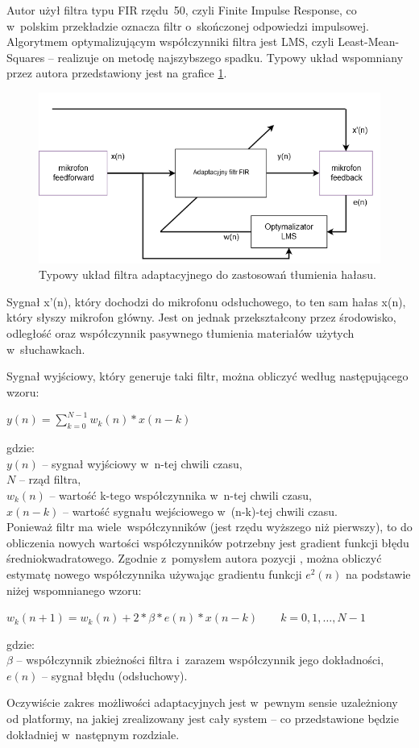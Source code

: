 Autor użył filtra typu FIR rzędu~50, czyli Finite Impulse Response, co w~polskim przekładzie oznacza filtr o~skończonej odpowiedzi impulsowej. Algorytmem optymalizującym współczynniki filtra jest LMS, czyli Least-Mean-Squares -- realizuje on metodę najszybszego spadku. Typowy układ wspomniany przez autora przedstawiony jest na grafice \ref{fig:typical_fir_lms}.
\begin{figure}[h!]
	\centering
	\includegraphics[width=\linewidth]{../Assets/typical_fir_lms.png}
	\caption{Typowy układ filtra adaptacyjnego do zastosowań tłumienia hałasu.}
	\label{fig:typical_fir_lms}
\end{figure}

Sygnał x'(n), który dochodzi do mikrofonu odsłuchowego, to ten sam hałas x(n), który słyszy mikrofon główny. Jest on jednak przekształcony przez środowisko, odległość oraz współczynnik pasywnego tłumienia materiałów użytych w~słuchawkach.

Sygnał wyjściowy, który generuje taki filtr, można obliczyć według następującego wzoru:\\
\begin{center} $ y(n) = \sum_{k=0}^{N-1} w_k(n)*x(n-k) $ \end{center}
gdzie:\\
$y(n)$ -- sygnał wyjściowy w~n-tej chwili czasu,\\
$N$ -- rząd filtra,\\
$w_k(n)$ -- wartość k-tego współczynnika w~n-tej chwili czasu,\\
$x(n-k)$ -- wartość sygnału wejściowego w~(n-k)-tej chwili czasu.\\
Ponieważ filtr ma wiele~współczynników (jest rzędu wyższego niż pierwszy), to do obliczenia nowych wartości współczynników potrzebny jest gradient funkcji błędu średniokwadratowego. Zgodnie z~pomysłem autora pozycji \cite{Chassaing}, można obliczyć estymatę nowego współczynnika używając gradientu funkcji $e^2(n)$ na podstawie niżej wspomnianego wzoru:\\
\begin{center} $ w_k(n+1) = w_k(n) + 2*\beta*e(n)*x(n-k) \qquad k=0,1,\dots,N-1 $ \end{center}
gdzie:\\
$\beta$ -- współczynnik zbieżności filtra i~zarazem współczynnik jego dokładności,\\
$e(n)$ -- sygnał błędu (odsłuchowy).

Oczywiście zakres możliwości adaptacyjnych jest w~pewnym sensie uzależniony od platformy, na jakiej zrealizowany jest cały system -- co przedstawione będzie dokładniej w~następnym rozdziale.